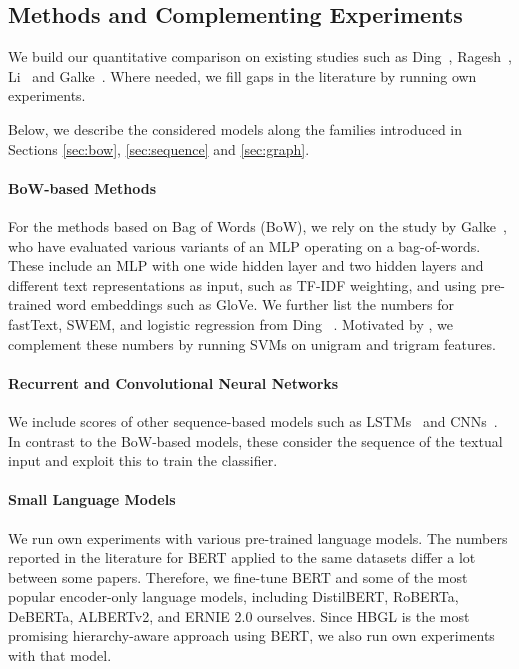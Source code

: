 \subsection{Methods and Complementing Experiments}

We build our quantitative comparison on existing studies such as Ding~\etal\cite{DBLP:conf/emnlp/DingWLLL20}, Ragesh~\etal\cite{DBLP:conf/wsdm/RageshSIBL21}, Li~\etal\cite{DBLP:journals/corr/abs-2405-11524} and Galke~\etal\cite{galkescherp-acl2022}.
Where needed, we fill gaps in the literature by running own experiments.

Below, we describe the considered models along the families introduced in Sections \ref{sec:bow}, \ref{sec:sequence} and \ref{sec:graph}.

\paragraph{BoW-based Methods}
For the methods based on Bag of Words (BoW), we rely on the study by Galke~\etal\cite{galkescherp-acl2022}, who have evaluated various variants of an MLP operating on a bag-of-words.
These include an MLP with one wide hidden layer
 and two hidden layers and different text representations as input, such as TF-IDF weighting, and using pre-trained word embeddings such as GloVe.
We further list the numbers for fastText, SWEM, and logistic regression from Ding \etal~\cite{DBLP:conf/emnlp/DingWLLL20}.
Motivated by \cite{DBLP:journals/corr/abs-2211-02563}, we complement these numbers by running SVMs on unigram and trigram features.

\paragraph{Recurrent and Convolutional Neural Networks} We include scores of other sequence-based models such as LSTMs~\cite{DBLP:conf/emnlp/DingWLLL20,zhao2021sequential} and CNNs~\cite{DBLP:conf/ijcnlp/ZhangW17,DBLP:conf/emnlp/Kim14}.
In contrast to the BoW-based models, these consider the sequence of the textual input and exploit this to train the classifier.

\paragraph{Small Language Models}
We run own experiments with various pre-trained language models.
The numbers reported in the literature for BERT applied to the same datasets differ a lot between some papers. 
Therefore, we fine-tune BERT and some of the most popular encoder-only language models, including DistilBERT, RoBERTa, DeBERTa,  ALBERTv2, and ERNIE 2.0 ourselves.
Since HBGL is the most promising hierarchy-aware approach using BERT, we also run own experiments with that model. 

